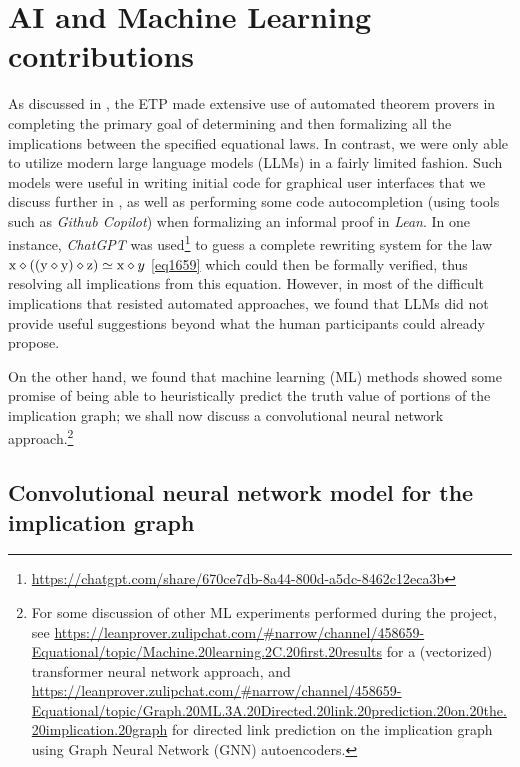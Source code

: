 \section{AI and Machine Learning contributions}\label{ml-sec}

As discussed in , the ETP made extensive use of automated theorem provers in completing the primary goal of determining and then formalizing all the implications between the specified equational laws.  In contrast, we were only able to utilize modern large language models (LLMs) in a fairly limited fashion.  Such models were useful in writing initial code for graphical user interfaces that we discuss further in , as well as performing some code autocompletion (using tools such as \emph{Github Copilot}) when formalizing an informal proof in \emph{Lean}.  In one instance, \emph{ChatGPT} was used\footnote{\url{https://chatgpt.com/share/670ce7db-8a44-800d-a5dc-8462c12eca3b}} to guess a complete rewriting system for the law $\mathrm{x} \diamond ((\mathrm{y} \diamond \mathrm{y}) \diamond \mathrm{z}) \simeq \mathrm{x} \diamond y$ \eqref{eq1659} which could then be formally verified, thus resolving all implications from this equation. However, in most of the difficult implications that resisted automated approaches, we found that LLMs did not provide useful suggestions beyond what the human participants could already propose.

On the other hand, we found that machine learning (ML) methods showed some promise of being able to heuristically predict the truth value of portions of the implication graph; we shall now discuss a convolutional neural network approach.\footnote{For some discussion of other ML experiments performed during the project, see \url{https://leanprover.zulipchat.com/\#narrow/channel/458659-Equational/topic/Machine.20learning.2C.20first.20results} for a (vectorized) transformer neural network approach, and \url{https://leanprover.zulipchat.com/\#narrow/channel/458659-Equational/topic/Graph.20ML.3A.20Directed.20link.20prediction.20on.20the.20implication.20graph} for directed link prediction on the implication graph using Graph Neural Network (GNN) autoencoders.}

\subsection{Convolutional neural network model for the implication graph}

